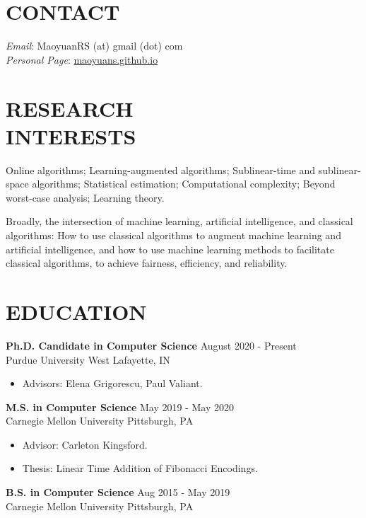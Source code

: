 \documentclass[margin, 10pt]{res} %
\begin{document}
\begin{resume}

\section{CONTACT}
\emph{Email}: MaoyuanRS (at) gmail (dot) com\\
\emph{Personal Page}: \href{https://maoyuans.github.io}{maoyuans.github.io}

 
\section{RESEARCH \\ INTERESTS}  

Online algorithms; Learning-augmented algorithms; Sublinear-time and sublinear-space algorithms; Statistical estimation; Computational complexity; Beyond worst-case analysis; Learning theory.

Broadly, the intersection of machine learning, artificial intelligence, and classical algorithms: How to use classical algorithms to augment machine learning and artificial intelligence, and how to use machine learning methods to facilitate classical algorithms, to achieve fairness, efficiency, and reliability.
 
\section{EDUCATION}

{\bf Ph.D. Candidate in Computer Science} \hfill August 2020 - Present \\
Purdue University \hfill West Lafayette, IN

\begin{itemize}
\item Advisors: Elena Grigorescu, Paul Valiant.
\end{itemize} 

{\bf M.S. in Computer Science} \hfill May 2019 - May 2020 \\
Carnegie Mellon University \hfill Pittsburgh, PA

\begin{itemize}
\item Advisor: Carleton Kingsford. \hspace{-2em}
\item Thesis: Linear Time Addition of Fibonacci Encodings.
\end{itemize} 

{\bf B.S. in Computer Science} \hfill Aug 2015 - May 2019 \\
Carnegie Mellon University \hfill Pittsburgh, PA


\end{resume}
\end{document}
